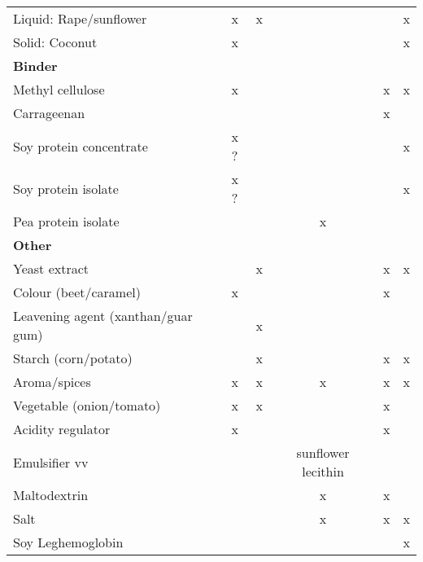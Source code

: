 \begin{table}[H]
{\begin{tabular}{l|c|c|c|c|c}
 Liquid: Rape/sunflower & x     & x     &       &       & x         \\
 Solid: Coconut         & x     &       &       &       & x         \\
 \textbf{Binder}        &       &       &       &       &           \\
 Methyl cellulose       & x     &       &       & x     & x         \\
 Carrageenan            &       &       &       & x     &           \\
 Soy protein concentrate& x ?   &       &       &       & x         \\
 Soy protein isolate    & x ?   &       &       &       & x         \\
 Pea protein isolate    &       &       & x     &       &           \\
 \textbf{Other}         &       &       &       &       &           \\
 Yeast extract          &       & x     &       & x     & x         \\
 Colour (beet/caramel)  & x     &       &       & x     &           \\
 Leavening agent (xanthan/guar gum) & & x &     &       &           \\
 Starch (corn/potato)   &       & x     &       & x     & x         \\
 Aroma/spices           & x     & x     & x     & x     & x         \\
 Vegetable (onion/tomato)& x    & x     &       & x     &           \\ 
 Acidity regulator      & x     &       &       & x     &           \\
 Emulsifier vv          &       &       & sunflower lecithin &      \\ 
 Maltodextrin           &       &       & x     & x     &           \\
 Salt                   &       &       & x     & x     & x         \\
 Soy Leghemoglobin      &       &       &       &       & x         \\
 
\bottomrule
    \end{tabular}
   }
    \label{tab:CommercialVegetarianBurgersComposition}
\end{table}



